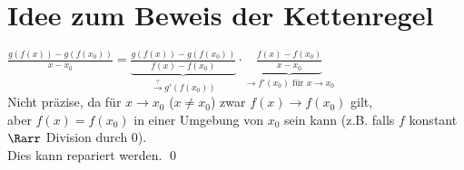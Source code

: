 \section*{Idee zum Beweis der Kettenregel}
$\frac{g(f(x)) - g(f(x_0))}{x-x_0} = \underbrace{\frac{g(f(x))-g(f(x_0))}{f(x)-f(x_0)}}_{\overset{\text{?}}{\to} g'(f(x_0))} \cdot \underbrace{\frac{f(x)-f(x_0)}{x-x_0}}_{\to f'(x_0) \text{ für } x \to x_0}$\\
Nicht präzise, da für $x \to x_0$ ($x \neq x_0$) zwar $f(x) \to f(x_0)$ gilt,\\
aber $f(x)=f(x_0)$ in einer Umgebung von $x_0$ sein kann (z.B. falls $f$ konstant $\Rarr$ Division durch $0$).\\
Dies kann repariert werden. \qed